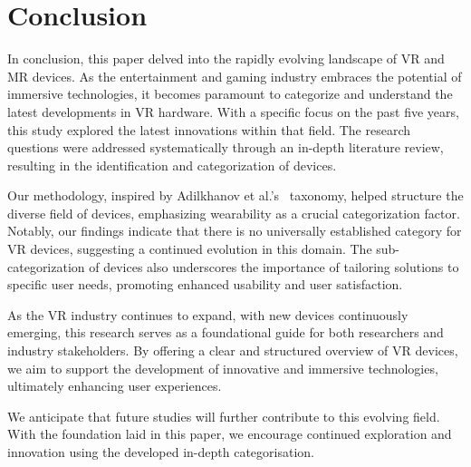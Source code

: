 \section{Conclusion}
\label{sec:conclusion}

In conclusion, this paper delved into the rapidly evolving landscape of VR and MR devices. As the entertainment and gaming industry embraces the potential of immersive technologies, it becomes paramount to categorize and understand the latest developments in VR hardware. With a specific focus on the past five years, this study explored the latest innovations within that field. The research questions were addressed systematically through an in-depth literature review, resulting in the identification and categorization of devices.

Our methodology, inspired by Adilkhanov et al.'s~\cite{Adilkhanov22} taxonomy, helped structure the diverse field of devices, emphasizing wearability as a crucial categorization factor. Notably, our findings indicate that there is no universally established category for VR devices, suggesting a continued evolution in this domain. The sub-categorization of devices also underscores the importance of tailoring solutions to specific user needs, promoting enhanced usability and user satisfaction.

As the VR industry continues to expand, with new devices continuously emerging, this research serves as a foundational guide for both researchers and industry stakeholders. By offering a clear and structured overview of VR devices, we aim to support the development of innovative and immersive technologies, ultimately enhancing user experiences.

We anticipate that future studies will further contribute to this evolving field. With the foundation laid in this paper, we encourage continued exploration and innovation using the developed in-depth categorisation.